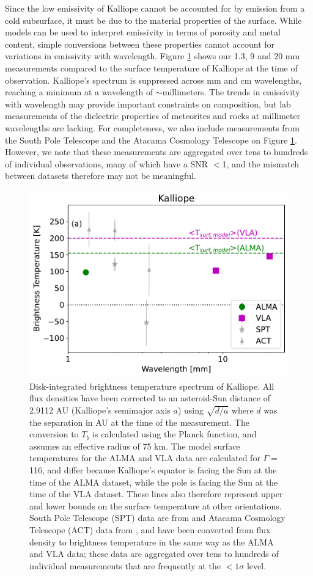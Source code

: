 \documentclass[]{aastex631}
\begin{document}
Since the low emissivity of Kalliope cannot be accounted for by emission from a cold subsurface, it must be due to the material properties of the surface. While models can be used to interpret emissivity in terms of porosity and metal content, simple conversions between these properties cannot account for variations in emissivity with wavelength. Figure \ref{fig:diskintspecA} shows our 1.3, 9 and 20 mm measurements compared to the surface temperature of Kalliope at the time of observation. Kalliope's spectrum is suppressed across mm and cm wavelengths, reaching a minimum at a wavelength of $\sim$millimeters. The trends in emissivity with wavelength may provide important constraints on composition, but lab measurements of the dielectric properties of meteorites and rocks at millimeter wavelengths are lacking. For completeness, we also include measurements from the South Pole Telescope \citep[SPT;][]{chichura2022} and the Atacama Cosmology Telescope \citep[ACT;][]{orlowski2024} on Figure \ref{fig:diskintspecA}. However, we note that these measurements are aggregated over tens to hundreds of individual observations, many of which have a SNR $<$1, and the mismatch between datasets therefore may not be meaningful.

\begin{figure}[t!]
\centering
\includegraphics[width=0.5\linewidth]{diskintspec_may2024_Kalliope.pdf}
\caption{Disk-integrated brightness temperature spectrum of Kalliope. All flux densities have been corrected to an asteroid-Sun distance of 2.9112 AU (Kalliope's semimajor axis $a$) using $\sqrt{d/a}$ where $d$ was the separation in AU at the time of the measurement. The conversion to $T_b$ is calculated using the Planck function, and assumes an effective radius of 75 km. The model surface temperatures for the ALMA and VLA data are calculated for $\Gamma=$116, and differ because Kalliope's equator is facing the Sun at the time of the ALMA dataset, while the pole is facing the Sun at the time of the VLA dataset. These lines also therefore represent upper and lower bounds on the surface temperature at other orientations. South Pole Telescope (SPT) data are from \cite{chichura2022} and Atacama Cosmology Telescope (ACT) data from \cite{orlowski2024}, and have been converted from flux density to brightness temperature in the same way as the ALMA and VLA data; these data are aggregated over tens to hundreds of individual measurements that are frequently at the $<1\sigma$ level.}
\label{fig:diskintspecA}
\end{figure}
\end{document}
